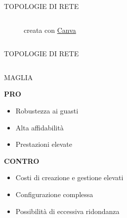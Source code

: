 \documentclass[aspectratio=1610,handout]{beamer}
\begin{document}
\begin{frame}{TOPOLOGIE DI RETE}
\begin{columns}
\begin{figure}
                \caption{{creata con \href{https://www.canva.com/}{Canva}}}
            \end{figure}
    \end{columns}
\end{frame}

\begin{frame}{TOPOLOGIE DI RETE}
    \begin{columns}
            \justifying
            \begin{alertblock}{MAGLIA}
                \begin{minipage}{0.96\linewidth}
                    \justifying
                    \textbf{PRO}
                    \begin{itemize}
                        \item Robustezza ai guasti
                        \pause
                        \item Alta affidabilità
                        \pause
                        \item Prestazioni elevate
                    \end{itemize}
                    \pause
                    \textbf{CONTRO}
                    \begin{itemize}
                        \item Costi di creazione e gestione elevati
                        \pause
                        \item Configurazione complessa
                        \pause
                        \item Possibilità di eccessiva ridondanza
                    \end{itemize}
                \end{minipage}
            \end{alertblock}
            \begin{figure}

\end{figure}
\end{columns}
\end{frame}
\end{document}
